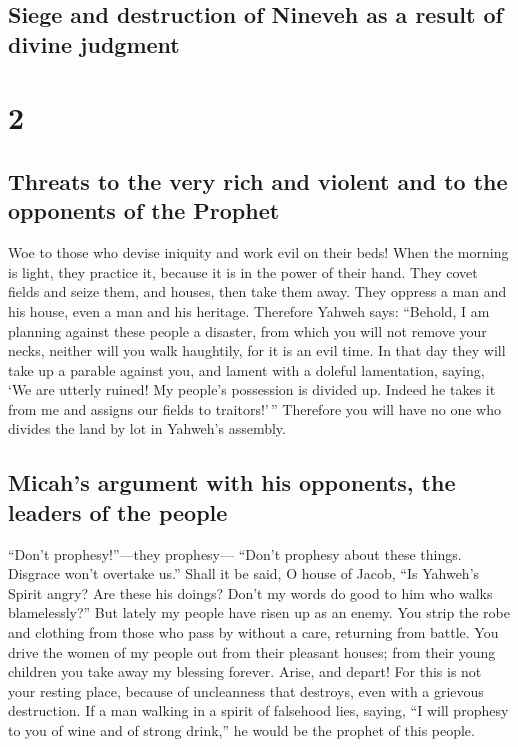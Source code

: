 \hypertarget{siege-and-destruction-of-nineveh-as-a-result-of-divine-judgment}{%
\subsection{Siege and destruction of Nineveh as a result of divine
judgment}\label{siege-and-destruction-of-nineveh-as-a-result-of-divine-judgment}}

\hypertarget{section-1}{%
\section{2}\label{section-1}}

\hypertarget{threats-to-the-very-rich-and-violent-and-to-the-opponents-of-the-prophet}{%
\subsection{Threats to the very rich and violent and to the opponents of
the
Prophet}\label{threats-to-the-very-rich-and-violent-and-to-the-opponents-of-the-prophet}}

 Woe to those who devise iniquity and work evil on their
beds! When the morning is light, they practice it, because it is in the
power of their hand.  They covet fields and seize them,
and houses, then take them away. They oppress a man and his house, even
a man and his heritage.  Therefore Yahweh says: ``Behold,
I am planning against these people a disaster, from which you will not
remove your necks, neither will you walk haughtily, for it is an evil
time.  In that day they will take up a parable against
you, and lament with a doleful lamentation, saying, `We are utterly
ruined! My people's possession is divided up. Indeed he takes it from me
and assigns our fields to traitors!'\,''  Therefore you
will have no one who divides the land by lot in Yahweh's assembly.

\hypertarget{micahs-argument-with-his-opponents-the-leaders-of-the-people}{%
\subsection{Micah's argument with his opponents, the leaders of the
people}\label{micahs-argument-with-his-opponents-the-leaders-of-the-people}}

 ``Don't prophesy!''---they prophesy--- ``Don't prophesy
about these things. Disgrace won't overtake us.''  Shall
it be said, O house of Jacob, ``Is Yahweh's Spirit angry? Are these his
doings? Don't my words do good to him who walks blamelessly?''
 But lately my people have risen up as an enemy. You strip
the robe and clothing from those who pass by without a care, returning
from battle.  You drive the women of my people out from
their pleasant houses; from their young children you take away my
blessing forever.  Arise, and depart! For this is not
your resting place, because of uncleanness that destroys, even with a
grievous destruction.  If a man walking in a spirit of
falsehood lies, saying, ``I will prophesy to you of wine and of strong
drink,'' he would be the prophet of this people.

